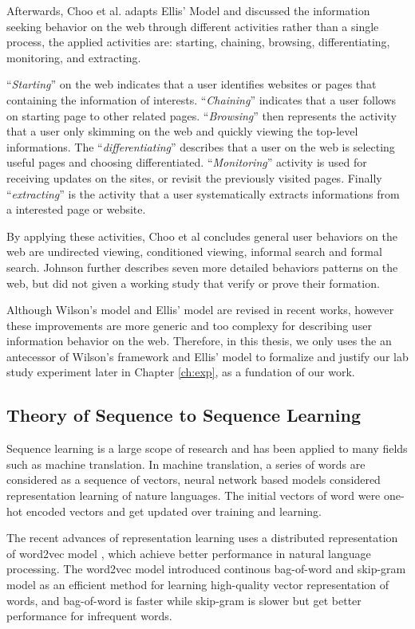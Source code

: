 Afterwards, Choo et al. adapts Ellis' Model and discussed \cite{choo1999information}
the information seeking behavior on the web through different activities rather 
than a single process, the applied activities are:
starting, chaining, browsing, differentiating, monitoring, and extracting.

``\emph{Starting}'' on the web indicates that a user identifies websites or pages
that containing the information of interests.
``\emph{Chaining}'' indicates that a user follows on starting page to other related pages.
``\emph{Browsing}'' then represents the activity that a user only skimming on the web
and quickly viewing the top-level informations. The ``\emph{differentiating}'' 
describes that a user on the web is selecting useful pages and choosing differentiated.
``\emph{Monitoring}'' activity is used for receiving updates on the sites, or revisit
the previously visited pages. Finally ``\emph{extracting}'' is the activity that a user
systematically extracts informations from a interested page or website.

By applying these activities, Choo et al concludes general user behaviors on the web are
undirected viewing, conditioned viewing, informal search and formal search.
Johnson further describes \cite{johnson2017patterns} seven more detailed behaviors 
patterns on the web, but did not given a working study that verify or prove their formation.

Although Wilson's model and Ellis' model are revised in recent works, however these improvements
are more generic and too complexy for describing user information behavior on the web.
Therefore, in this thesis, we only uses the an antecessor of Wilson's framework \cite{wilson1997information} and 
Ellis' model \cite{ellis1997modelling} to formalize and justify our lab study experiment later in Chapter \ref{ch:exp}, 
as a fundation of our work.

\subsection{Theory of Sequence to Sequence Learning}
\label{sec:seq-learn}

Sequence learning is a large scope of research and has been applied to many fields such as 
machine translation. In machine translation, a series of words are considered as a sequence of
vectors, neural network based models considered representation learning of nature languages.
The initial vectors of word were one-hot encoded vectors and get updated over training and learning.

The recent advances of representation learning uses a distributed representation 
of word2vec model \cite{DBLP:journals/corr/abs-1301-3781}, which achieve better 
performance in natural language processing. The word2vec model introduced 
continous bag-of-word and skip-gram model as an efficient method for learning high-quality
vector representation of words, and bag-of-word is faster while skip-gram is slower but get better
performance for infrequent words.

\cleardoublepage